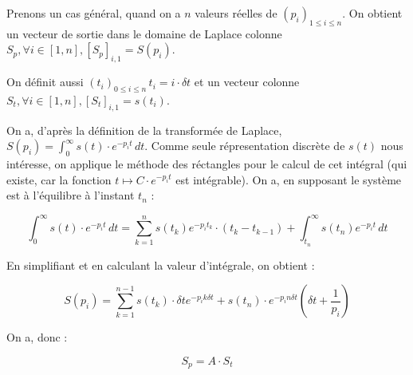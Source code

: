 \documentclass[11pt]{article} %
\begin{document}
Prenons un cas général, quand on a \begin{math} n \end{math} valeurs réelles de \begin{math} (p_i)_{1 \leq i \leq n}\end{math}. On obtient un vecteur de sortie dans le domaine de Laplace colonne \begin{math} S_p ,  \forall i \in [1,n],  [S_p]_{i,1} = S(p_i) \end{math}.

On définit aussi \begin{math} (t_i)_{0 \leq i \leq n} \, t_i = i \cdot \delta t \end{math} et un vecteur colonne \begin{math} S_t ,  \forall i \in [1,n],  [S_t]_{i,1} = s(t_i) \end{math}.

On a, d'après la définition de la transformée de Laplace, \begin{math}  S(p_i) = \int_{0}^{\infty} s(t) \cdot e^{-p_i t}\,dt\end{math}. Comme seule répresentation discrète de \begin{math} s(t) \end{math} nous intéresse, on applique le méthode des réctangles pour le calcul de cet intégral (qui existe, car la fonction \begin{math} t \mapsto C \cdot e^{-p_i t}\end{math} est intégrable). On a, en supposant le système est à l'équilibre à l'instant \begin{math} t_n \end{math} :

\begin{equation}  \int_{0}^{\infty} s(t) \cdot e^{-p_i t}\,dt = \sum_{k=1}^{n} s(t_k) e^{-p_i t_k} \cdot (t_k - t_{k-1}) + \int_{t_n}^{\infty} s(t_n) e^{-p_i t} \, dt \end{equation}

En simplifiant et en calculant la valeur d'intégrale, on obtient : 

\begin{equation} S(p_i) = \sum_{k=1}^{n-1} s(t_k) \cdot \delta t e^{-p_i k \delta t} + s(t_n) \cdot e^{-p_i n \delta t}(\delta t  + \frac{1}{p_i})\end{equation}

On a, donc :

\begin{equation} S_p = A \cdot S_t \end{equation} 
\end{document}
